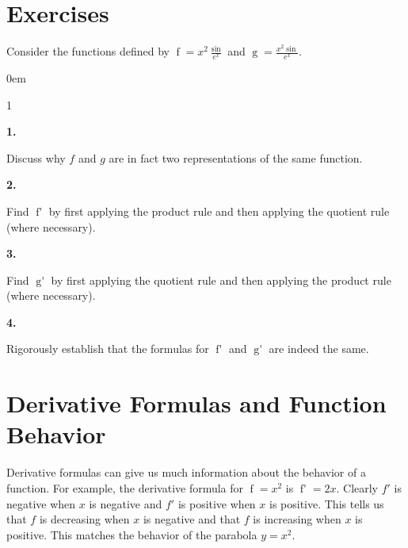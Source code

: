 \documentclass[12pt,]{book}
\theoremstyle{plain}
\theoremstyle{definition}
\numberwithin{equation}{section}
\newenvironment{exercisegroup}%
{\medskip\noindent}%
{\par\bigskip}%
\newlength{\exercisegroupindent}%
\newlength{\exercisegroupitemwidth}%
\newenvironment{exercisegrouplist}%
{\vspace{-\partopsep}%
\begin{adjustwidth}{\exercisegroupindent}{0em}}%
{\end{adjustwidth}%
\vspace{-\partopsep}%
\vspace{\baselineskip}}%
\newenvironment{exercisegroupbycol}[1]%
{\begin{exercisegrouplist}%
\vspace{-\multicolsep}%
\begin{multicols}{#1}%
\setlength{\parindent}{0em}%
\setlength{\exercisegroupitemwidth}{\linewidth}}%
{\end{multicols}%
\vspace{-\multicolsep}%
\end{exercisegrouplist}}%
\newenvironment{exercisegroupitem}[1]%
{\begin{minipage}[t]{\exercisegroupitemwidth}
\vspace{0pt}%
{\bfseries#1}%
\rule{0pt}{\baselineskip}}{\strut%
\end{minipage}%
\hspace{\columnsep}}%
\providecommand\phantomsection{}
\newcommand{\fe}[2]{\mathop{{#1}{\left(#2\right)}}}
\newcommand{\fd}[1]{#1'}
\begin{document}
\section*{Exercises}\label{exercises-36}

\begin{exercisegroup}%
Consider the functions defined by \(\fe{f}{x}=x^2\frac{\fe{\sin}{x}}{e^x}\) and \(\fe{g}{x}=\frac{x^2\fe{\sin}{x}}{e^x}\).%
\begin{exercisegroupbycol}{1}%
\begin{exercisegroupitem}{1. }\phantomsection\hypertarget{exercise-270}{\null}
Discuss why \(f\) and \(g\) are in fact two representations of the same function.%
\end{exercisegroupitem}%
\par%
\begin{exercisegroupitem}{2. }\phantomsection\hypertarget{exercise-271}{\null}
Find \(\fe{\fd{f}}{x}\) by first applying the product rule and then applying the quotient rule (where necessary).%
\end{exercisegroupitem}%
\par%
\begin{exercisegroupitem}{3. }\phantomsection\hypertarget{exercise-272}{\null}
Find \(\fe{\fd{g}}{x}\) by first applying the quotient rule and then applying the product rule (where necessary).%
\end{exercisegroupitem}%
\par%
\begin{exercisegroupitem}{4. }\phantomsection\hypertarget{exercise-273}{\null}
Rigorously establish that the formulas for \(\fe{\fd{f}}{x}\) and \(\fe{\fd{g}}{x}\) are indeed the same.%
\end{exercisegroupitem}%
\par%
\end{exercisegroupbycol}%
\end{exercisegroup}%
\typeout{************************************************}
\typeout{************************************************}
\section[Derivative Formulas and Function Behavior]{Derivative Formulas and Function Behavior}\label{section-derivative-formulas-and-function-behavior}
Derivative formulas can give us much information about the behavior of a function.  For example, the derivative formula for \(\fe{f}{x}=x^2\) is \(\fe{\fd{f}}{x}=2x\).  Clearly \(\fd{f}\) is negative when \(x\) is negative and \(\fd{f}\) is positive when \(x\) is positive.  This tells us that \(f\) is decreasing when \(x\) is negative and that \(f\) is increasing when \(x\) is positive.  This matches the behavior of the parabola \(y=x^2\).%
\typeout{************************************************}
\typeout{************************************************}
\end{document}

